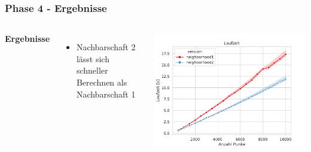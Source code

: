 \documentclass[aspectratio=169]{beamer}
\begin{document}

\begin{frame}
\frametitle{Phase 4 - Ergebnisse}
\begin{columns}[c] %
	
	\textbf{Ergebnisse}
	\begin{itemize}
		\item Nachbarschaft 2 lässt sich schneller Berechnen als Nachbarschaft 1
	\end{itemize}
	\includegraphics[scale=.45]{runtime_neighborhood.pdf}	
\end{columns}
\end{frame}

\end{document}
